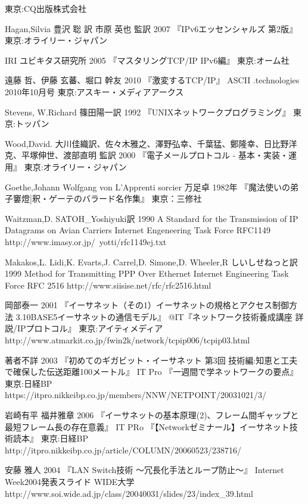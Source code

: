\begin{thebibliography}{99}
    東京:CQ出版株式会社	
\item
	Hagan,Silvia
	豊沢 聡 訳
	市原 英也 監訳
	2007
	『IPv6エッセンシャルズ 第2版』
	東京:オライリー・ジャパン
\item
	IRI
	ユビキタス研究所
	2005
	『マスタリングTCP/IP IPv6編』
	東京:オーム社
\item
	遠藤 哲、伊藤 玄蕃、堀口 幹友
	2010
	『激変するTCP/IP』
	ASCII .technologies 2010年10月号
	東京:アスキー・メディアアークス
\item
      Stevens, W.Richard
	篠田陽一訳
	1992
	『UNIXネットワークプログラミング』
	東京:トッパン
\item
     Wood,David.
	大川佳織訳、佐々木雅之、澤野弘幸、千葉猛、鄭隆幸、日比野洋克、平塚伸世、渡部直明 監訳
	2000
	『電子メールプロトコル - 基本・実装・運用』
	東京:オライリー・ジャパン	
\item
      Goethe,Johann Wolfgang von
	L'Apprenti sorcier
	万足卓
	1982年
	『魔法使いの弟子窶燈]釈・ゲーテのバラード名作集』
	東京：三修社
\item
	Waitzman,D.
	SATOH\_Yoshiyuki訳
	1990
	A Standard for the Transmission of IP Datagrams on Avian Carriers Internet Engeneering Task Force RFC1149
	http://www.imasy.or.jp/~yotti/rfc1149ej.txt
\item
     Makakos,L. Lidi,K. Evarts,J. Carrel,D. Simone,D. Wheeler,R
	しいしせねっと訳
	1999
	Method for Transmitting PPP Over Ethernet Internet Engineering Task Force RFC 2516
     http://www.siisise.net/rfc/rfc2516.html
\item
     岡部泰一
	2001
	『イーサネット（その1）イーサネットの規格とアクセス制御方法 3.10BASE5イーサネットの通信モデル』 @IT『ネットワーク技術養成講座 詳説/IPプロトコル』 
	東京:アイティメディア
     http://www.atmarkit.co.jp/fwin2k/network/tcpip006/tcpip03.html
\item
     著者不詳
	2003
	『初めてのギガビット・イーサネット 第3回 技術編:知恵と工夫で確保した伝送距離100メートル』 IT Pro 『一週間で学ネットワークの要点』
	東京:日経BP
     https://itpro.nikkeibp.co.jp/members/NNW/NETPOINT/20031021/3/
\item
    岩崎有平 福井雅章
	2006
	『イーサネットの基本原理(2)、フレーム間ギャップと最短フレーム長の存在意義』 IT PRo 『【Networkゼミナール】イーサネット技術読本』
	東京:日経BP
     http://itpro.nikkeibp.co.jp/article/COLUMN/20060523/238716/
\item
     安藤 雅人
	2004
	『LAN Switch技術 ～冗長化手法とループ防止～』 Internet Week2004発表スライド
	WIDE大学
     http://www.soi.wide.ad.jp/class/20040031/slides/23/index\_39.html

\end{thebibliography}

